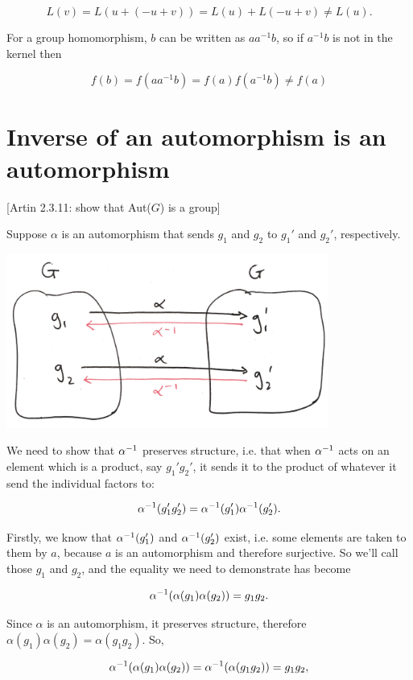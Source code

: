 $$
L(v) = L(u + (-u + v)) = L(u) + L(-u + v) \neq L(u).
$$

For a group homomorphism, $b$ can be written as $aa^{-1}b$, so if $a^{-1}b$ is
not in the kernel then

$$
f(b) = f(aa^{-1}b) = f(a)f(a^{-1}b) \neq f(a)
$$


\section{Inverse of an automorphism is an automorphism}

[Artin 2.3.11: show that Aut($G$) is a group]

Suppose $\alpha$ is an automorphism that sends $g_1$ and $g_2$ to $g_1'$ and
$g_2'$, respectively.

\begin{mdframed}
\includegraphics[width=300pt]{img/inverse-of-automorphism-1.png}
\end{mdframed}

We need to show that $\alpha^{-1}$ preserves structure, i.e. that when $\alpha^{-1}$ acts
on an element which is a product, say $g_1'g_2'$, it sends it to the product of
whatever it send the individual factors to:

$$
\alpha^{-1}(g_1'g_2') = \alpha^{-1}(g_1')\alpha^{-1}(g_2').
$$


Firstly, we know that $\alpha^{-1}(g_1')$ and $\alpha^{-1}(g_2')$ exist, i.e. some elements
are taken to them by $a$, because $a$ is an automorphism and therefore
surjective. So we'll call those $g_1$ and $g_2$, and the equality we need to
demonstrate has become

$$
\alpha^{-1}(\alpha(g_1)\alpha(g_2)) = g_1g_2.
$$

Since $\alpha$ is an automorphism, it preserves structure, therefore
$\alpha(g_1)\alpha(g_2) = \alpha(g_1g_2)$. So,

$$
\alpha^{-1}(\alpha(g_1)\alpha(g_2)) = \alpha^{-1}(\alpha(g_1g_2)) = g_1g_2,
$$


